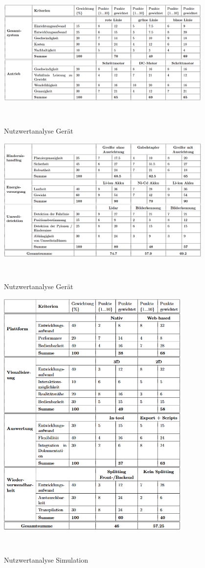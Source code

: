 \documentclass[main.tex]{subfiles} %
\begin{document}
\begin{figure}[h]
    \centering
    \includegraphics[width=0.95\textwidth]{./fig_Morphologischer_Kasten/Nutzwertanalyse_1.png}
    \caption{Nutzwertanalyse Gerät}~\label{fig:Nutzwertanalyse_1}
\end{figure}

\begin{figure}[h]
    \centering
    \includegraphics[width=0.95\textwidth]{./fig_Morphologischer_Kasten/Nutzwertanalyse_2.png}
    \caption{Nutzwertanalyse Gerät}~\label{fig:Nutzwertanalyse_2}
\end{figure}

\newpage

\begin{figure}[h]
    \centering
    \includegraphics[width=0.85\textwidth]{./fig_Morphologischer_Kasten/Nutzwertanalyse_Simulation.png}
    \caption{Nutzwertanalyse Simulation}~\label{fig:Nutzwertanalyse_Simulation}
\end{figure}
\end{document}
